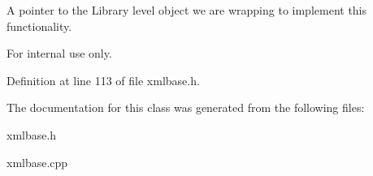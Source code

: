 A pointer to the Library level object we are wrapping to implement this functionality. 

\begin{DoxyInternal}{For internal use only.}
\end{DoxyInternal}


Definition at line 113 of file xmlbase.h.



The documentation for this class was generated from the following files:\begin{DoxyCompactItemize}
\item 
xmlbase.h\item 
xmlbase.cpp\end{DoxyCompactItemize}
